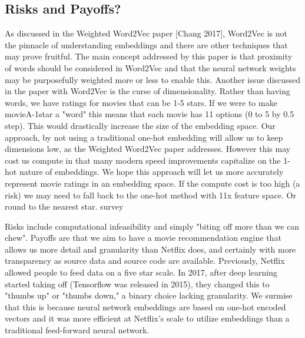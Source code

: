 \subsection{Risks and Payoffs?}

As discussed in the Weighted Word2Vec paper [Chang 2017], Word2Vec is not the pinnacle of understanding embeddings and there are other techniques that may prove fruitful. The main concept addressed by this paper is that proximity of words should be considered in Word2Vec and that the neural network weights may be purposefully weighted more or less to enable this. Another issue discussed in the paper with Word2Vec is the curse of dimensionality. Rather than having words, we have ratings for movies that can be 1-5 stars. If we were to make movieA-1star a "word" this means that each movie has 11 options (0 to 5 by 0.5 step). This would drastically increase the size of the embedding space. Our approach, by not using a traditional one-hot embedding will allow us to keep dimensions low, as the Weighted Word2Vec paper addresses. However this may cost us compute in that many modern speed improvements capitalize on the 1-hot nature of embeddings. We hope this approach will let us more accurately represent movie ratings in an embedding space. If the compute cost is too high (a risk) we may need to fall back to the one-hot method with 11x feature space. Or round to the nearest star. survey

Risks include computational infeasibility and simply "biting off more than we can chew". Payoffs are that we aim to have a movie recommendation engine that allows us more detail and granularity than Netflix does, and certainly with more transparency as source data and source code are available. Previously, Netflix allowed people to feed data on a five star scale. In 2017, after deep learning started taking off (Tensorflow was released in 2015), they changed this to "thumbs up" or "thumbs down," a binary choice lacking granularity. We surmise that this is because neural network embeddings are based on one-hot encoded vectors and it was more efficient at Netflix's scale to utilize embeddings than a traditional feed-forward neural network.
